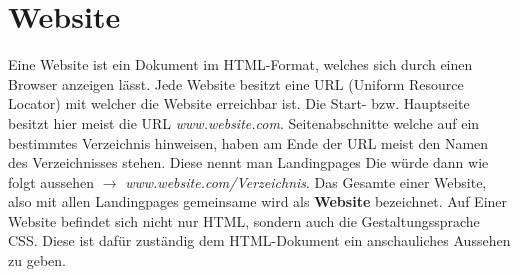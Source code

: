 \section{Website}
\label{websitetheorie}

Eine Website ist ein Dokument im HTML-Format, welches sich durch einen Browser anzeigen lässt.
Jede Website besitzt eine URL (Uniform Resource Locator) mit welcher die Website erreichbar ist.
Die Start- bzw. Hauptseite besitzt hier meist die URL \textit{www.website.com}. Seitenabschnitte 
welche auf ein bestimmtes Verzeichnis hinweisen, haben am Ende der URL meist den Namen des 
Verzeichnisses stehen. Diese nennt man Landingpages Die würde dann wie folgt aussehen $\rightarrow$ 
\textit{www.website.com/Verzeichnis}. Das Gesamte einer Website, also mit allen Landingpages 
gemeinsame wird als \textbf{Website} bezeichnet. Auf Einer Website befindet sich nicht nur HTML, 
sondern auch die Gestaltungssprache CSS. Diese ist dafür zuständig dem HTML-Dokument ein 
anschauliches Aussehen zu geben.~\cite{Website}